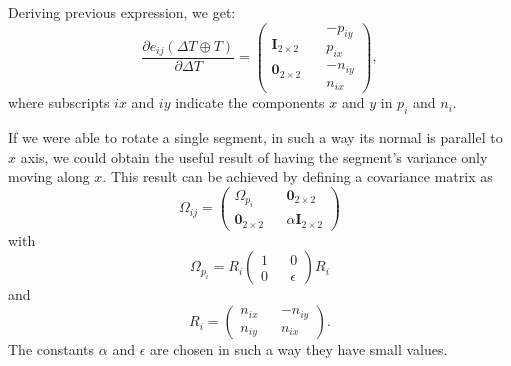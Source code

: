 \documentclass[a4paper, onecolumn]{report}
\begin{document}
Deriving previous expression, we get:
\begin{equation}
	\frac{\partial e_{ij}(\Delta T \oplus T)}{\partial \Delta T} = \left(\begin{matrix} \textbf{I}_{2 \times 2} \\ \\ \textbf{0}_{2 \times 2} \end{matrix} \quad \begin{matrix} -p_{iy} \\ p_{ix} \\ -n_{iy} \\ n_{ix}\end{matrix}\right),
\end{equation}
where subscripts $ix$ and $iy$ indicate the components $x$ and $y$ in $p_i$ and $n_i$.

If we were able to rotate a single segment, in such a way its normal is parallel to $x$ axis, we could obtain the useful result of having the segment's variance only moving along $x$. This result can be achieved by defining a covariance matrix as
\begin{equation}
	\Omega_{ij} = \left(\begin{matrix} \Omega_{p_i} && \textbf{0}_{2\times2} \\ \textbf{0}_{2\times2} && \alpha \textbf{I}_{2\times2} \end{matrix}\right)
\end{equation}
with
\begin{equation} \Omega_{p_i} = R_i\left(\begin{matrix} 1 && 0 \\ 0 && \epsilon \end{matrix}\right)R_i\end{equation}
and
\begin{equation}
	R_i = \left(\begin{matrix} n_{ix} && -n_{iy} \\ n_{iy} && n_{ix} \end{matrix} \right).
\end{equation}
The constants $\alpha$ and $\epsilon$ are chosen in such a way they have small values.
\end{document}
